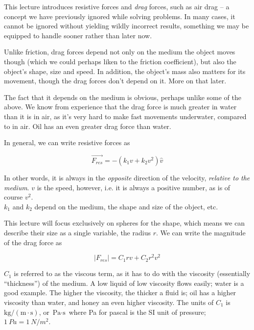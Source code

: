 \documentclass[12pt,a4paper]{report}
\begin{document}
This lecture introduces resistive forces and \emph{drag} forces, such as air drag -- a concept we have previously ignored while solving problems. In many cases, it cannot be ignored without yielding wildly incorrect results, something we may be equipped to handle sooner rather than later now.

Unlike friction, drag forces depend not only on the medium the object moves though (which we could perhaps liken to the friction coefficient), but also the object's shape, size and speed. In addition, the object's mass also matters for its movement, though the drag forces don't depend on it. More on that later.

The fact that it depends on the medium is obvious, perhaps unlike some of the above. We know from experience that the drag force is much greater in water than it is in air, as it's very hard to make fast movements underwater, compared to in air. Oil has an even greater drag force than water.

In general, we can write resistive forces as

\begin{equation}
\vec{F_{res}} = -\left( k_1 v + k_2 v^2 \right) \hat{v}
\end{equation}

In other words, it is always in the \emph{opposite} direction of the velocity, \emph{relative to the medium}. $v$ is the speed, however, i.e. it is always a positive number, as is of course $v^2$.\\
$k_1$ and $k_2$ depend on the medium, the shape and size of the object, etc.

This lecture will focus exclusively on spheres for the shape, which means we can describe their size as a single variable, the radius $r$. We can write the magnitude of the drag force as

\begin{equation}
|F_{res}| = C_1 r v + C_2 r^2 v^2
\end{equation}

$C_1$ is referred to as the viscous term, as it has to do with the viscosity (essentially ``thickness'') of the medium. A low liquid of low viscosity flows easily; water is a good example. The higher the viscosity, the thicker a fluid is; oil has a higher viscosity than water, and honey an even higher viscosity. The units of $C_1$ is $\text{kg}/(\text{m} \cdot \text{s})$, or $\text{Pa} \cdot \text{s}$ where Pa for pascal is the SI unit of pressure; $\SI{1}{Pa} = \SI{1}{N/m^2}$.
\end{document}
